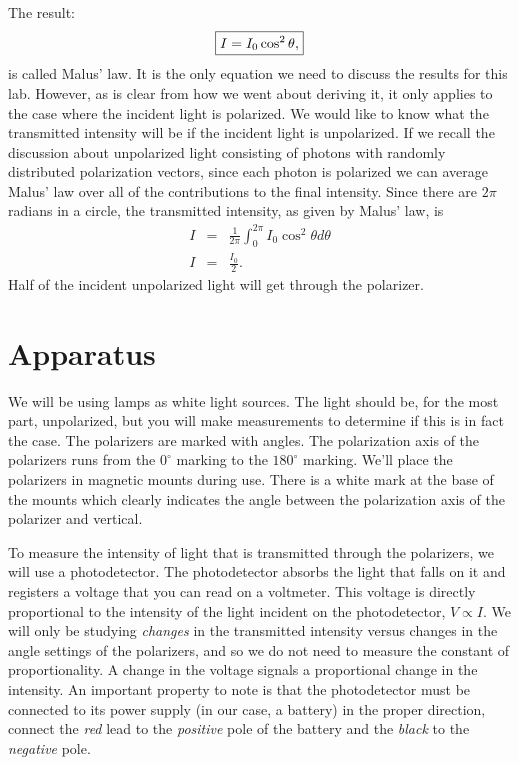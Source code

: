 The result: \\
\begin{equation}
\fbox{$ \displaystyle I = I_0 \cos^2\theta, $} \label{eq:pol:maluslaw}
\end{equation}
is called Malus' law. It is the only 
equation we need to discuss the results for this lab. However, as is clear from
how we went about deriving it, it only applies to the case where the incident
light is polarized. We would like to know what the transmitted intensity will
be if the incident light is unpolarized. If we recall the discussion about
unpolarized light consisting of photons with randomly distributed polarization
vectors, since each photon is polarized we can average Malus' law over all of 
the contributions to the final intensity. Since there are $2\pi$ radians in a 
circle, the transmitted intensity, as given by Malus' law, is
\begin{eqnarray*}
I &=& \frac{1}{2\pi} \int_0^{2\pi} I_0 \cos^2\theta d\theta \nonumber \\
I &=& \frac{I_0}{2}.
\end{eqnarray*}
Half of the incident unpolarized light will get through the polarizer. 

\section{Apparatus}

We will be using lamps as white light sources. The light should be, for the 
most part, unpolarized, but you will make measurements to determine if this is 
in fact the case.  The polarizers are marked with angles. The polarization
axis of the polarizers runs from the $0^\circ$ marking to the $180^\circ$ 
marking.  We'll place the polarizers in magnetic mounts during use. There
is a white mark at the base of the mounts which clearly indicates the angle 
between the polarization axis of the polarizer and vertical.

To measure the intensity of light that is transmitted through the polarizers, 
we will use a photodetector.  The photodetector absorbs the light that falls
on it and registers a voltage that you can read on a voltmeter. This voltage
is directly proportional to the intensity of the light incident on the 
photodetector, $V\propto I$.  We will only be studying {\it changes} in the
transmitted intensity versus changes in the angle settings of the polarizers,
and so we do not need to measure the constant of proportionality. A change in 
the voltage signals a proportional change in the intensity.  An important
property to note is that the photodetector must be connected to its power 
supply (in our case, a battery) in the proper direction, connect the {\it red} 
lead to the {\it positive} pole of the battery and the {\it black} to the 
{\it negative} pole.

